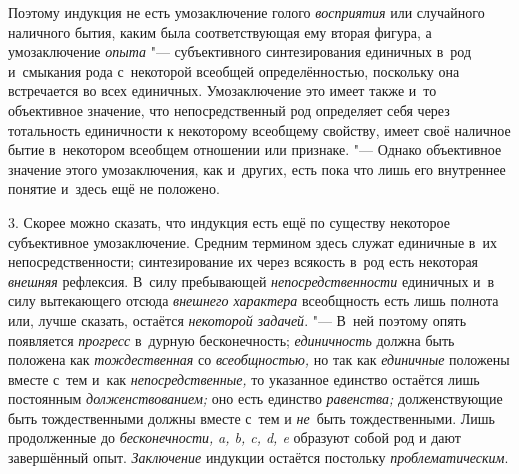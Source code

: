 Поэтому индукция не есть умозаключение голого
{\em восприятия} или
случайного наличного бытия, каким была соответствующая ему вторая фигура, а
умозаключение {\em опыта}
"--- субъективного синтезирования единичных в~род и~смыкания
рода с~некоторой всеобщей определённостью, поскольку она встречается во
всех единичных. Умозаключение это имеет также и~то объективное значение,
что непосредственный род определяет себя через тотальность единичности к
некоторому всеобщему свойству, имеет своё наличное бытие в~некотором
всеобщем отношении или признаке. "--- Однако объективное
значение этого умозаключения, как и~других, есть пока что лишь его
внутреннее понятие и~здесь ещё не положено.

3. Скорее можно сказать, что индукция есть ещё по существу
некоторое субъективное умозаключение. Средним термином здесь служат
единичные в~их непосредственности; синтезирование их через всякость в~род
есть некоторая {\em внешняя}
рефлексия. В~силу пребывающей
{\em непосредственности}
единичных и~в силу вытекающего отсюда
{\em внешнего характера}
всеобщность есть лишь полнота или, лучше
сказать, остаётся {\em некоторой
задачей}. "--- В~ней поэтому опять появляется
{\em прогресс} в~дурную
бесконечность; {\em единичность}
должна быть положена как
{\em тождественная} со
{\em всеобщностью,} но
так как {\em единичные}
положены вместе с~тем и~как
{\em непосредственные,}
то указанное единство остаётся лишь постоянным
{\em долженствованием;}
оно есть единство
{\em равенства;}
долженствующие быть тождественными должны вместе с~тем и
{\em не}~быть
тождественными. Лишь продолженные до
{\em бесконечности,}
{\em a, b, c, d, e} образуют собой род и
дают завершённый опыт. {\em Заключение}
индукции остаётся постольку
{\em проблематическим}.

